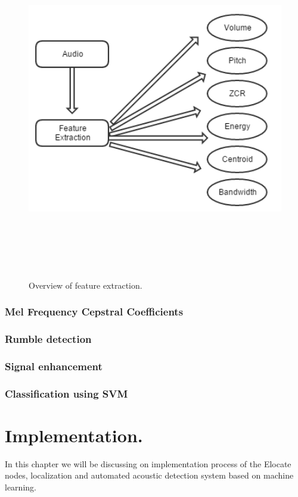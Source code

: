 \documentclass[12pt]{article}
\numberwithin{figure}{section}
\numberwithin{table}{section}
\begin{document}
\begin{figure}[H]
\centering
\includegraphics[width=12cm,height=15cm,keepaspectratio]{feature_extraction.png}
\caption{Overview of feature extraction.}
\label{feature_extraction}
\end{figure}




\subsubsection{Mel Frequency Cepstral Coefficients}
\subsubsection{Rumble detection}
\subsubsection{Signal enhancement}
\subsubsection{Classification using SVM}


\newpage
\section{Implementation.}
In this chapter we will be discussing on implementation process of the Elocate nodes, localization and automated acoustic detection system based on machine learning.
\end{document}
